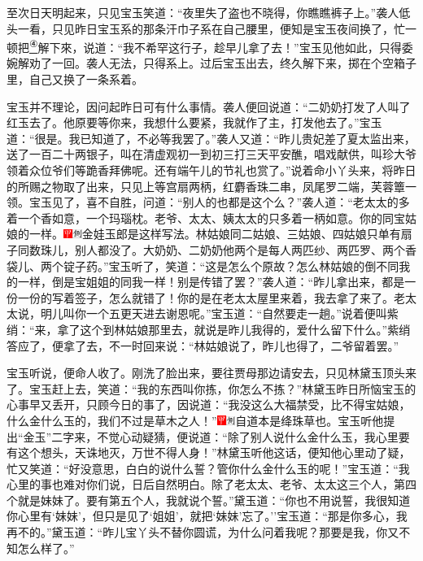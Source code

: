 至次日天明起来，只见宝玉笑道：``夜里失了盗也不晓得，你瞧瞧裤子上。''袭人低头一看，只见昨日宝玉系的那条汗巾子系在自己腰里，便知是宝玉夜间换了，忙一顿把\href{../Text/part0032_split_000.html\#lnkback_4_a}{\textsuperscript{④}}解下來，说道：``我不希罕这行子，趁早儿拿了去！''宝玉见他如此，只得委婉解劝了一回。袭人无法，只得系上。过后宝玉出去，终久解下来，掷在个空箱子里，自己又换了一条系着。

宝玉并不理论，因问起昨日可有什么事情。袭人便回说道：``二奶奶打发了人叫了红玉去了。他原要等你来，我想什么要紧，我就作了主，打发他去了。''宝玉道：``很是。我已知道了，不必等我罢了。''袭人又道：``昨儿贵妃差了夏太监出来，送了一百二十两银子，叫在清虚观初一到初三打三天平安醮，唱戏献供，叫珍大爷领着众位爷们等跪香拜佛呢。还有端午儿的节礼也赏了。''说着命小丫头来，将昨日的所赐之物取了出来，只见上等宫扇两柄，红麝香珠二串，凤尾罗二端，芙蓉簟一领。宝玉见了，喜不自胜，问道：``别人的也都是这个么？''袭人道：``老太太的多着一个香如意，一个玛瑙枕。老爷、太太、姨太太的只多着一柄如意。你的同宝姑娘的一样。{\includegraphics[width=3mm]{../Images/00002}\includegraphics[width=3mm]{../Images/00011}\footnotesize \kaishu 金娃玉郎是这样写法。}林姑娘同二姑娘、三姑娘、四姑娘只单有扇子同数珠儿，别人都没了。大奶奶、二奶奶他两个是每人两匹纱、两匹罗、两个香袋儿、两个锭子药。''宝玉听了，笑道：``这是怎么个原故？怎么林姑娘的倒不同我的一样，倒是宝姐姐的同我一样！别是传错了罢？''袭人道：``昨儿拿出来，都是一份一份的写着签子，怎么就错了！你的是在老太太屋里来着，我去拿了来了。老太太说，明儿叫你一个五更天进去谢恩呢。''宝玉道：``自然要走一趟。''说着便叫紫绡：``来，拿了这个到林姑娘那里去，就说是昨儿我得的，爱什么留下什么。''紫绡答应了，便拿了去，不一时回来说：``林姑娘说了，昨儿也得了，二爷留着罢。''

宝玉听说，便命人收了。刚洗了脸出来，要往贾母那边请安去，只见林黛玉顶头来了。宝玉赶上去，笑道：``我的东西叫你拣，你怎么不拣？''林黛玉昨日所恼宝玉的心事早又丢开，只顾今日的事了，因说道：``我没这么大福禁受，比不得宝姑娘，什么金什么玉的，我们不过是草木之人！''{\includegraphics[width=3mm]{../Images/00002}\includegraphics[width=3mm]{../Images/00011}\footnotesize \kaishu 自道本是绛珠草也。}宝玉听他提出``金玉''二字来，不觉心动疑猜，便说道：``除了别人说什么金什么玉，我心里要有这个想头，天诛地灭，万世不得人身！''林黛玉听他这话，便知他心里动了疑，忙又笑道：``好没意思，白白的说什么誓？管你什么金什么玉的呢！''宝玉道：``我心里的事也难对你们说，日后自然明白。除了老太太、老爷、太太这三个人，第四个就是妹妹了。要有第五个人，我就说个誓。''黛玉道：``你也不用说誓，我很知道你心里有`妹妹'，但只是见了`姐姐'，就把`妹妹'忘了。''宝玉道：``那是你多心，我再不的。''黛玉道：``昨儿宝丫头不替你圆谎，为什么问着我呢？那要是我，你又不知怎么样了。''

